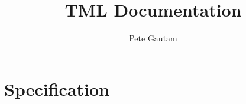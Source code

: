 \documentclass{article}
\title{TML Documentation}
\author{Pete Gautam}
\theoremstyle{definition}
\theoremstyle{plain}
\begin{document}

    \maketitle

    \section{Specification}
\end{document}
